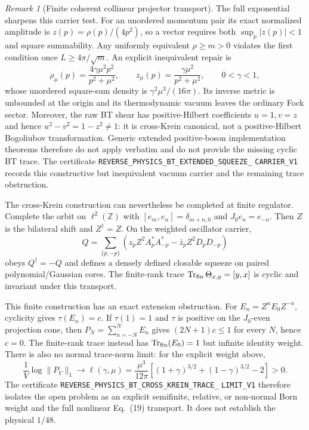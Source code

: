 \documentclass[11pt]{article}
\theoremstyle{definition}
\theoremstyle{remark}
\newtheorem{remark}[theorem]{Remark}
\begin{document}
\begin{remark}[Finite coherent collinear projector transport]
The full exponential sharpens this carrier test.  For an unordered momentum
pair its exact normalized amplitude is
$z(p)=\rho(p)/(4p^2)$, so a vector requires both
$\sup_p|z(p)|<1$ and square summability.  Any uniformly equivalent
$\rho\geq m>0$ violates the first condition once
$L\geq4\pi/\sqrt m$.  An explicit inequivalent repair is
\[
 \rho_\mu(p)=\frac{4\gamma\mu^2p^2}{p^2+\mu^2},\qquad
 z_\mu(p)=\frac{\gamma\mu^2}{p^2+\mu^2},\qquad0<\gamma<1,
\]
whose unordered square-sum density is $\gamma^2\mu^3/(16\pi)$.  Its inverse
metric is unbounded at the origin and its thermodynamic vacuum leaves the
ordinary Fock sector.  Moreover, the raw BT shear has positive-Hilbert
coefficients $u=1,v=z$ and hence $u^2-v^2=1-z^2\ne1$: it is cross-Krein
canonical, not a positive-Hilbert Bogoliubov transformation.  Generic extended
positive-boson implementation theorems therefore do not apply verbatim and do
not provide the missing cyclic BT trace.  The certificate
\texttt{REVERSE\_PHYSICS\_BT\_EXTENDED\_SQUEEZE\_}
\allowbreak\texttt{CARRIER\_V1} records this constructive but inequivalent
vacuum carrier and the remaining trace obstruction.

The cross-Krein construction can nevertheless be completed at finite
regulator.  Complete the orbit on $\ell^2(\mathbb Z)$ with
$[e_m,e_n]=\delta_{m+n,0}$ and $J_0e_n=e_{-n}$.  Then $Z$ is the bilateral
shift and $Z^\dagger=Z$.  On the weighted oscillator carrier,
\[
 Q=\sum_{\{p,-p\}}\left(
 z_pZ^2A_p^*A_{-p}^*-\bar z_pZ^2D_pD_{-p}\right)
\]
obeys $Q^\dagger=-Q$ and defines a densely defined closable squeeze on paired
polynomial/Gaussian cores.  The finite-rank trace
$\operatorname{Tr}_{\rm fin}\Theta_{x,y}=[y,x]$ is cyclic and invariant under
this transport.

This finite construction has an exact extension obstruction.  For
$E_n=Z^nE_0Z^{-n}$, cyclicity gives $\tau(E_n)=c$.  If $\tau(1)=1$ and
$\tau$ is positive on the $J_0$-even projection cone, then
$P_N=\sum_{n=-N}^NE_n$ gives $(2N+1)c\leq1$ for every $N$, hence $c=0$.
The finite-rank trace instead has $\operatorname{Tr}_{\rm fin}(E_0)=1$ but
infinite identity weight.  There is also no normal trace-norm limit: for the
explicit weight above,
\[
 \frac1V\log\|P_V\|_1
 \longrightarrow
 \ell(\gamma,\mu)=\frac{\mu^3}{12\pi}\left[
 (1+\gamma)^{3/2}+(1-\gamma)^{3/2}-2\right]>0.
\]
The certificate
\texttt{REVERSE\_PHYSICS\_BT\_CROSS\_KREIN\_TRACE\_}
\allowbreak\texttt{LIMIT\_V1} therefore isolates the open problem as an explicit
semifinite, relative, or non-normal Born weight and the full nonlinear
Eq.~(19) transport.  It does not establish the physical $1/48$.


\end{remark}
\end{document}
